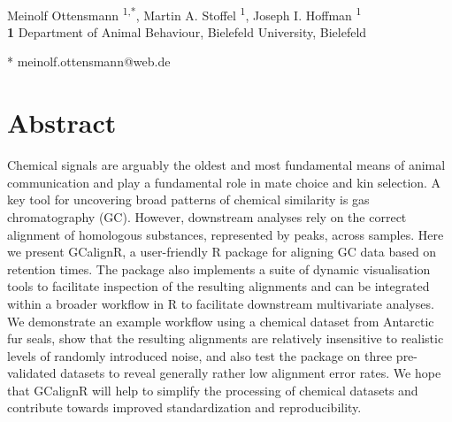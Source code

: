 \documentclass[10pt,letterpaper]{article}
\date{}
\begin{document}
\vspace*{0.2in}
\def\code#1{\texttt{#1}}
\begin{flushleft}
{\Large
\textbf{} 
}
\newline
\\
Meinolf Ottensmann \textsuperscript{1,*},
Martin A. Stoffel \textsuperscript{1},
Joseph I. Hoffman \textsuperscript{1}
\\
\bigskip
\textbf{1} Department of Animal Behaviour, Bielefeld University, Bielefeld
\\
\bigskip

* meinolf.ottensmann@web.de

\end{flushleft}
\section*{Abstract}
Chemical signals are arguably the oldest and most fundamental means of animal communication and play a fundamental role in mate choice and kin selection. A key tool for uncovering broad patterns of chemical similarity is gas chromatography (GC). However, downstream analyses rely on the correct alignment of homologous substances, represented by peaks, across samples. Here we present GCalignR, a user-friendly R package for aligning GC data based on retention times. The package also implements a suite of dynamic visualisation tools to facilitate inspection of the resulting alignments and can be integrated within a broader workflow in R to facilitate downstream multivariate analyses. We demonstrate an example workflow using a chemical dataset from Antarctic fur seals, show that the resulting alignments are relatively insensitive to realistic levels of randomly introduced noise, and also test the package on three pre-validated datasets to reveal generally rather low alignment error rates. We hope that GCalignR will help to simplify the processing of chemical datasets and contribute towards improved standardization and reproducibility.
\linenumbers

\end{document}
